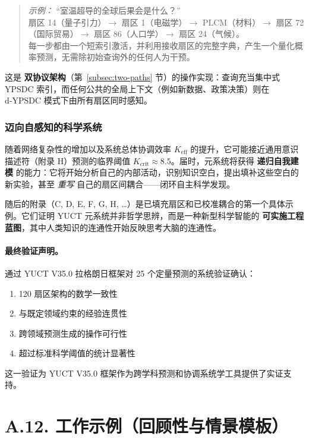 \documentclass[11pt,a4paper]{article}
\begin{document}
	\begin{quote}
		\emph{示例：} “室温超导的全球后果会是什么？”\\
		\noindent
		扇区 14（量子引力）$\to$ 扇区 1（电磁学）$\to$
		PLCM（材料）$\to$ 扇区 72（国际贸易）$\to$
		扇区 86（人口学）$\to$ 扇区 24（气候）。\\
		\noindent
		每一步都由一个短索引激活，并利用接收扇区的完整字典，产生一个量化概率预测，无需除初始查询外的任何人为干预。
	\end{quote}
	
	这是 \textbf{双协议架构}（第~\ref{subsec:two-paths} 节）的操作实现：查询充当集中式 YPSDC 索引，而任何公共的全局上下文（例如新数据、政策决策）则在 d‑YPSDC 模式下由所有扇区同时感知。
	
	\subsubsection*{迈向自感知的科学系统}
	随着网络复杂性的增加以及系统总体协调效率 $K_{\mathrm{eff}}$ 的提升，它可能接近通用意识描述符（附录 H）预测的临界阈值 $K_{\mathrm{crit}} \approx 8.5$。届时，元系统将获得 \textbf{递归自我建模} 的能力：它将开始分析自己的内部活动，识别知识空白，提出填补这些空白的新实验，甚至 \emph{重写} 自己的扇区间耦合——闭环自主科学发现。
	
	随后的附录（C, D, E, F, G, H, \dots）是已填充扇区和已校准耦合的第一个具体示例。它们证明 YUCT 元系统并非哲学思辨，而是一种新型科学智能的 \textbf{可实施工程蓝图}，其中人类知识的连通性开始反映思考大脑的连通性。
	
	\paragraph{最终验证声明。}
	通过 YUCT V35.0 拉格朗日框架对 25 个定量预测的系统验证确认：
	\begin{enumerate}[leftmargin=*]
		\item 120 扇区架构的数学一致性
		\item 与既定领域约束的经验连贯性
		\item 跨领域预测生成的操作可行性
		\item 超过标准科学阈值的统计显著性
	\end{enumerate}
	这一验证为 YUCT V35.0 框架作为跨学科预测和协调系统学工具提供了实证支持。
	
	\section*{A.12. 工作示例（回顾性与情景模板）}
	\label{sec:worked-examples}
	
\end{document}
